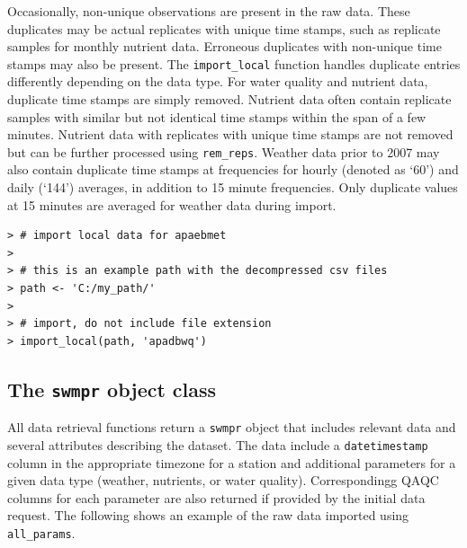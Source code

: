 \documentclass[10pt,letterpaper]{article}\usepackage[]{graphicx}\usepackage[]{color}
\makeatletter
\newenvironment{kframe}{%
 \def\at@end@of@kframe{}%
 \ifinner\ifhmode%
  \def\at@end@of@kframe{\end{minipage}}%
  \begin{minipage}{\columnwidth}%
 \fi\fi%
 \def\FrameCommand##1{\hskip\@totalleftmargin \hskip-\fboxsep
 \colorbox{shadecolor}{##1}\hskip-\fboxsep
     \hskip-\linewidth \hskip-\@totalleftmargin \hskip\columnwidth}%
 \MakeFramed {\advance\hsize-\width
   \@totalleftmargin\z@ \linewidth\hsize
   \@setminipage}}%
 {\par\unskip\endMakeFramed%
 \at@end@of@kframe}
\newenvironment{knitrout}{}{} %
\makeatother
\begin{document}
Occasionally, non-unique observations are present in the raw data.  These duplicates may be actual replicates with unique time stamps, such as replicate samples for monthly nutrient data.  Erroneous duplicates with non-unique time stamps may also be present.  The \texttt{import\_local} function handles duplicate entries differently depending on the data type.  For water quality and nutrient data, duplicate time stamps are simply removed.  Nutrient data often contain replicate samples with similar but not identical time stamps within the span of a few minutes.  Nutrient data with replicates with unique time stamps are not removed but can be further processed using \texttt{rem\_reps}.  Weather data prior to 2007 may also contain duplicate time stamps at frequencies for hourly (denoted as `60') and daily (`144') averages, in addition to 15 minute frequencies.  Only duplicate values at 15 minutes are averaged for weather data during import.  

\begin{knitrout}\small
{}\color{fgcolor}\begin{kframe}
\begin{verbatim}
> # import local data for apaebmet
> 
> # this is an example path with the decompressed csv files
> path <- 'C:/my_path/'
> 
> # import, do not include file extension
> import_local(path, 'apadbwq') 
\end{verbatim}
\end{kframe}
\end{knitrout}

\subsection*{The \texttt{swmpr} object class}

All data retrieval functions return a \texttt{swmpr} object that includes relevant data and several attributes describing the dataset.  The data include a \texttt{datetimestamp} column in the appropriate timezone for a station and additional parameters for a given data type (weather, nutrients, or water quality).  Correspondingg \ac{QAQC} columns for each parameter are also returned if provided by the initial data request.  The following shows an example of the raw data imported using \texttt{all\_params}.
\end{document}
